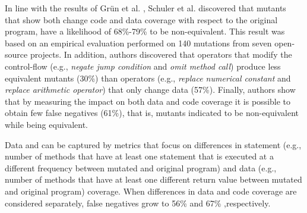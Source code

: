 In line with the results of Gr\"{u}n et al. \cite{grun2009impact}, Schuler et al. \cite{schuler2010covering,schuler2013covering} discovered that mutants that show both change code and data coverage with respect to the original program, have a likelihood of 68\%-79\% to be non-equivalent.
This result was based on an empirical evaluation performed on 140 mutations from seven open-source projects.
In addition, authors discovered that operators that modify the control-flow (e.g., \textit{negate jump condition} and \textit{omit method call}) produce less equivalent mutants (30\%) 
than operators (e.g., \textit{replace numerical constant} and \textit{replace arithmetic operator}) that only change data (57\%).
Finally, 
 authors show that by measuring the impact on both data and code coverage it is possible to obtain few false negatives (61\%), that is, mutants indicated to be non-equivalent while being equivalent. 

Data and  can be captured by metrics that focus on differences in statement (e.g., number of methods that have at least one statement that is executed at a different frequency between mutated and original program) and data (e.g., number of methods that have at least one different return value between mutated and original program) coverage. 
When differences in data and code coverage are considered separately, false negatives grow to 56\% and 67\% ,respectively.

